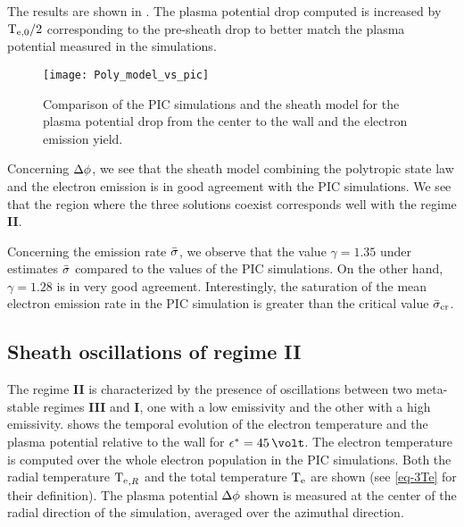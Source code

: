     The results are shown in .
    The plasma potential drop computed is increased by $\mathrm{T_{e, 0}}/2$ corresponding to the pre-sheath drop to better match the plasma potential measured in the simulations.

    \begin{figure}[hbtp]
      \centering
      \texttt{[image: Poly\_model\_vs\_pic]}
      \caption{Comparison of the PIC simulations and the sheath model for the plasma potential drop from the center to the wall and the electron emission yield. }
      \label{fig-Poly_model_vs_pic}
    \end{figure}

    Concerning $\Delta \phi$, we see that the sheath model combining the polytropic state law and the electron emission is in good agreement with the \ac{PIC} simulations.
    We see that the region where the three solutions coexist corresponds well with the regime {\bf II}.

    Concerning the emission rate $ \bar{\sigma }$, we observe that the value $\gamma=1.35$ under estimates $ \bar{\sigma }$ compared to the values of the \ac{PIC} simulations.
    On the other hand, $\gamma=1.28$ is in very good agreement.
    Interestingly, the saturation of the mean electron emission rate in the \ac{PIC} simulation is greater than the critical value $ \bar{\sigma }_{\rm cr}$.
    
    
  \subsection{Sheath oscillations of regime {\bf II}} \label{subsec-pic_scheath_RSO}
  
    The regime {\bf II} is characterized by the presence of oscillations between two meta-stable regimes {\bf III} and {\bf I}, one with a low emissivity and the other with a high emissivity.
     shows the temporal evolution of the electron temperature and the plasma potential relative to the wall for $\crover=45\,\volt$.
    The electron temperature is computed over the whole electron population in the \ac{PIC} simulations.
    Both the radial temperature $\mathrm{T_e}_{,R}$ and the total temperature $\mathrm{T_e}$ are shown (see \cref{eq-3Te} for their definition).
    The plasma potential $\Delta \phi$ shown is measured at the center of the radial direction of the simulation, averaged over the azimuthal direction.
    
